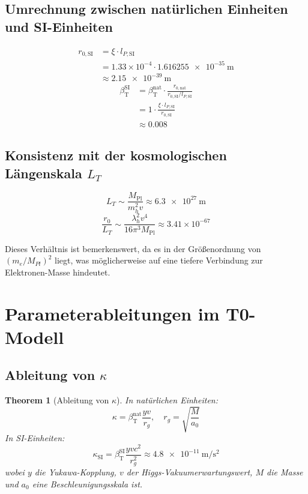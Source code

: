 \documentclass[12pt,a4paper]{article}
\newcommand{\Mpl}{M_{\text{Pl}}}
\newcommand{\betaT}{\beta_{\text{T}}}
\newtheorem{theorem}{Theorem}[section]
\begin{document}
	\subsection{Umrechnung zwischen natürlichen Einheiten und SI-Einheiten}
	
	\begin{align}
		r_{0,\text{SI}} &= \xi \cdot l_{P,\text{SI}} \\
		&= 1.33 \times 10^{-4} \cdot \SI{1.616255e-35}{\meter} \\
		&\approx \SI{2.15e-39}{\meter}
	\end{align}
	\begin{align}
		\betaT^{\text{SI}} &= \betaT^{\text{nat}} \cdot \frac{r_{0,\text{nat}}}{r_{0,\text{SI}}/l_{P,\text{SI}}} \\
		&= 1 \cdot \frac{\xi \cdot l_{P,\text{SI}}}{r_{0,\text{SI}}} \\
		&\approx 0.008
	\end{align}
	
	\subsection{Konsistenz mit der kosmologischen Längenskala \(L_T\)}
	
	\begin{equation}
		L_T \sim \frac{\Mpl}{m_h^2 v} \approx \SI{6.3e27}{\meter}
	\end{equation}
	\begin{equation}
		\frac{r_0}{L_T} \sim \frac{\lambda_h^2 v^4}{16\pi^3 \Mpl} \approx 3.41 \times 10^{-67}
	\end{equation}
	
	Dieses Verhältnis ist bemerkenswert, da es in der Größenordnung von \((m_e/M_{Pl})^2\) liegt, was möglicherweise auf eine tiefere Verbindung zur Elektronen-Masse hindeutet.
	
	\section{Parameterableitungen im T0-Modell}
	
	\subsection{Ableitung von \(\kappa\)}
	
	\begin{theorem}[Ableitung von \(\kappa\)]
		In natürlichen Einheiten:
		\begin{equation}
			\kappa = \betaT^{\text{nat}} \frac{y v}{r_g}, \quad r_g = \sqrt{\frac{M}{a_0}}
		\end{equation}
		In SI-Einheiten:
		\begin{equation}
			\kappa_{\text{SI}} = \betaT^{\text{SI}} \frac{y v c^2}{r_g^2} \approx \SI{4.8e-11}{\meter\per\second\squared}
		\end{equation}
		wobei \(y\) die Yukawa-Kopplung, \(v\) der Higgs-Vakuumerwartungswert, \(M\) die Masse und \(a_0\) eine Beschleunigungsskala ist.
	\end{theorem}
	
\end{document}
